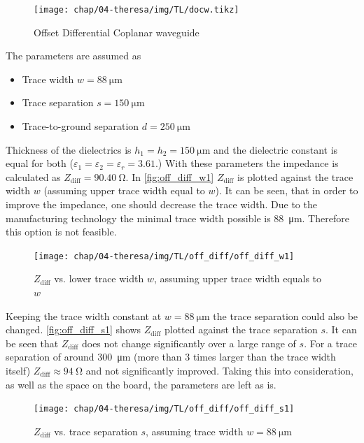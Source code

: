\begin{figure}[tbh]
	\centering
	\texttt{[image: chap/04-theresa/img/TL/docw.tikz]}
	\caption{Offset Differential Coplanar waveguide}
	\label{fig:docw_d1}
\end{figure}

The parameters are assumed as
\begin{itemize}
	\item Trace width $w = \SI{88}{\micro \meter}$ 
	\item Trace separation $s = \SI{150}{\micro \meter}$
	\item Trace-to-ground separation $d = \SI{250}{\micro \meter}$
\end{itemize}
Thickness of the dielectrics is $h_1 = h_2 = \SI{150}{\micro \meter}$  and the dielectric constant is equal for both ($\varepsilon_1 = \varepsilon_2 = \varepsilon_r = 3.61$.)
With these parameters the impedance is calculated as $Z_\text{diff} = \SI{90.40}{\ohm}$.
In \autoref{fig:off_diff_w1} $Z_\text{diff}$ is plotted against the trace width $w$ (assuming upper trace width equal to $w$). It can be seen, that in order to improve the impedance, one should decrease the trace width. 
Due to the manufacturing technology the minimal trace width possible is \SI{88}{\micro \meter}. 
Therefore this option is not feasible.

\begin{figure}[tbh]
	\centering
	\texttt{[image: chap/04-theresa/img/TL/off\_diff/off\_diff\_w1]}
	\caption[DOWG, $Z_\text{diff}$ vs. $w$]{$Z_\text{diff}$ vs. lower trace width $w$, assuming upper trace width equals to $w$}
	\label{fig:off_diff_w1}
\end{figure}

Keeping the trace width constant at $w = \SI{88}{\micro \meter}$ the trace separation could also be changed.
\autoref{fig:off_diff_s1} shows $Z_\text{diff}$ plotted against the trace separation $s$.
It can be seen that $Z_\text{diff}$ does not change significantly over a large range of $s$.
For a trace separation of around \SI{300}{\micro \meter} (more than 3 times larger than the trace width itself) $Z_\text{diff} \approx \SI{94}{\ohm}$ and not significantly improved.
Taking this into consideration, as well as the space on the board, the parameters are left as is.  
\begin{figure}[tbh]
	\centering
	\texttt{[image: chap/04-theresa/img/TL/off\_diff/off\_diff\_s1]}
	\caption[DOWG, $Z_\text{diff}$ vs. $s$]{$Z_\text{diff}$ vs. trace separation $s$, assuming trace width $w = \SI{88}{\micro \meter}$}
	\label{fig:off_diff_s1}
\end{figure}

